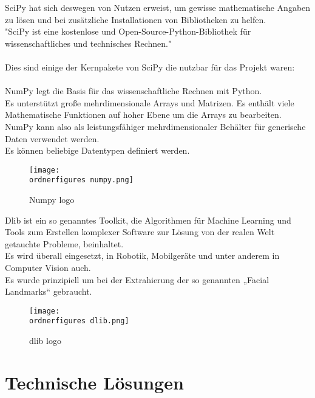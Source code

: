 SciPy hat sich deswegen von Nutzen erweist, um gewisse mathematische Angaben zu lösen und bei zusätzliche Installationen von Bibliotheken zu helfen.\\ 
"SciPy ist eine kostenlose und Open-Source-Python-Bibliothek für wissenschaftliches und technisches Rechnen."\\\cite{2019arXiv190710121V-scipy}
 \\ 
Dies sind einige der Kernpakete von SciPy die nutzbar für das Projekt waren:\\ 
 \\ 
NumPy legt die Basis für das wissenschaftliche Rechnen mit Python.\\ Es unterstützt große mehrdimensionale Arrays und Matrizen. Es enthält viele Mathematische Funktionen auf hoher Ebene um die Arrays zu bearbeiten.\\
NumPy kann also als leistungsfähiger mehrdimensionaler Behälter für generische Daten verwendet werden.\\ Es können beliebige Datentypen definiert werden.
\\
\begin{figure}[H]
	\texttt{[image: \\ordnerfigures numpy.png]}
	\caption{Numpy logo}
	\label{fig:Numpy logo}
\end{figure}\cite{Numpy}

Dlib ist ein so genanntes Toolkit, die Algorithmen für Machine Learning und Tools zum Erstellen komplexer Software zur Lösung von der realen Welt getauchte Probleme, beinhaltet.\\
Es wird überall eingesetzt, in Robotik, Mobilgeräte und unter anderem in Computer Vision auch.\cite{dlib} \\
Es wurde prinzipiell um bei der Extrahierung der so genannten „Facial Landmarks“ gebraucht. \\

\begin{figure}[H]
	\texttt{[image: \\ordnerfigures dlib.png]}
	\caption{dlib logo}
	\label{fig:dlib logo}
\end{figure}\cite{dlib}


\section{Technische Lösungen}

